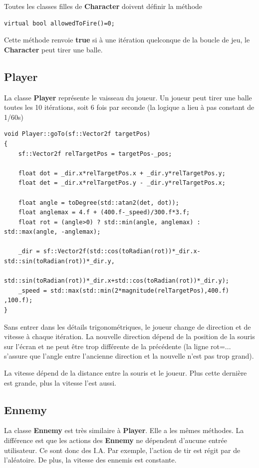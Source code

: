 \documentclass{article}
\begin{document}
Toutes les classes filles de \textbf{Character} doivent définir la méthode

\begin{verbatim}
virtual bool allowedToFire()=0;
\end{verbatim}

Cette méthode renvoie \textbf{true} si à une itération quelconque de la boucle de jeu, le \textbf{Character} peut tirer une balle.

\subsection{Player}

La classe \textbf{Player} représente le vaisseau du joueur. Un joueur peut tirer une balle toutes les 10 itérations, soit 6 fois par seconde (la logique a lieu à pas constant de 1/60s)

\begin{verbatim}
void Player::goTo(sf::Vector2f targetPos)
{
    sf::Vector2f relTargetPos = targetPos-_pos;

    float dot = _dir.x*relTargetPos.x + _dir.y*relTargetPos.y;
    float det = _dir.x*relTargetPos.y - _dir.y*relTargetPos.x;

    float angle = toDegree(std::atan2(det, dot));
    float anglemax = 4.f + (400.f-_speed)/300.f*3.f;
    float rot = (angle>0) ? std::min(angle, anglemax) : std::max(angle, -anglemax); 

    _dir = sf::Vector2f(std::cos(toRadian(rot))*_dir.x-std::sin(toRadian(rot))*_dir.y, 
    	std::sin(toRadian(rot))*_dir.x+std::cos(toRadian(rot))*_dir.y);
    _speed = std::max(std::min(2*magnitude(relTargetPos),400.f) ,100.f);
}
\end{verbatim}

Sans entrer dans les détails trigonométriques, le joueur change de direction et de vitesse à chaque itération. La nouvelle direction dépend de la position de la souris sur l'écran et ne peut être trop différente de la précédente (la ligne rot=... s'assure que l'angle entre l'ancienne direction et la nouvelle n'est pas trop grand).

La vitesse dépend de la distance entre la souris et le joueur. Plus cette dernière est grande, plus la vitesse l'est aussi.


\subsection{Ennemy}

La classe \textbf{Ennemy} est très similaire à \textbf{Player}. Elle a les mêmes méthodes. La différence est que les actions des \textbf{Ennemy} ne dépendent d'aucune entrée utilisateur. Ce sont donc des I.A. Par exemple, l'action de tir est régit par de l'aléatoire. De plus, la vitesse des ennemis est constante.
\end{document}
